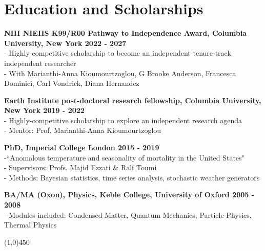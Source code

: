 \section*{Education and Scholarships}

\textbf{NIH NIEHS K99/R00 Pathway to Independence Award, Columbia University, New York \hfill 2022 - 2027}\\
- Highly-competitive scholarship to become an independent tenure-track independent researcher\\
- With Marianthi-Anna Kioumourtzoglou, G Brooke Anderson, Francesca Dominici, Carl Vondrick, Diana Hernandez\medskip

\noindent \textbf{Earth Institute post-doctoral research fellowship, Columbia University, New York \hfill 2019 - 2022}\\
- Highly-competitive scholarship to explore an independent research agenda\\
- Mentor: Prof. Marianthi-Anna Kioumourtzoglou \medskip

\noindent \textbf{PhD, Imperial College London \hfill 2015 - 2019}\\
-``Anomalous temperature and seasonality of mortality in the United States"\\	 		
- Supervisors: Profs. Majid Ezzati \& Ralf Toumi\\
- Methods: Bayesian statistics, time series analysis, stochastic weather generators\medskip

\noindent \textbf{BA/MA (Oxon), Physics, Keble College, University of Oxford \hfill 2005 - 2008}\\
- Modules included: Condensed Matter,  Quantum Mechanics, Particle Physics, Thermal Physics		                             
\begin{center} \line(1,0){450} \end{center}